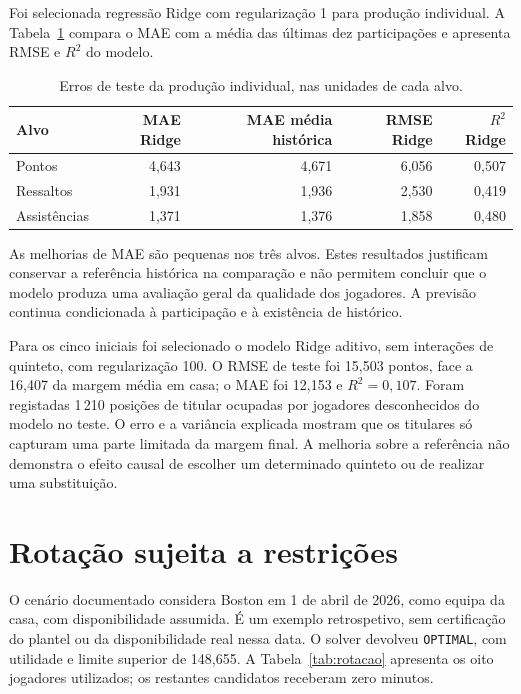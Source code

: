 Foi selecionada regressão Ridge com regularização 1 para produção
individual. A Tabela~\ref{tab:producao} compara o MAE com a média das
últimas dez participações e apresenta RMSE e \(R^2\) do modelo.

\begin{table}[htbp]
\centering
\caption{Erros de teste da produção individual, nas unidades de cada alvo.}
\label{tab:producao}
\begin{tabular}{lrrrr}
\toprule
Alvo & MAE Ridge & MAE média histórica & RMSE Ridge & \(R^2\) Ridge\\
\midrule
Pontos & 4,643 & 4,671 & 6,056 & 0,507\\
Ressaltos & 1,931 & 1,936 & 2,530 & 0,419\\
Assistências & 1,371 & 1,376 & 1,858 & 0,480\\
\bottomrule
\end{tabular}
\end{table}

As melhorias de MAE são pequenas nos três alvos. Estes resultados
justificam conservar a referência histórica na comparação e não permitem
concluir que o modelo produza uma avaliação geral da qualidade dos jogadores.
A previsão continua condicionada à participação e à existência de histórico.

Para os cinco iniciais foi selecionado o modelo Ridge aditivo, sem
interações de quinteto, com regularização 100. O RMSE de teste foi
15,503 pontos, face a 16,407 da margem média em casa; o MAE foi 12,153 e
\(R^2=0{,}107\). Foram registadas 1\,210 posições de titular ocupadas por
jogadores desconhecidos do modelo no teste. O erro e a variância explicada
mostram que os titulares só capturam uma parte limitada da margem final.
A melhoria sobre a referência não demonstra o efeito causal de escolher
um determinado quinteto ou de realizar uma substituição.

\section{Rotação sujeita a restrições}

O cenário documentado considera Boston em 1 de abril de 2026, como equipa
da casa, com disponibilidade assumida. É um exemplo retrospetivo, sem
certificação do plantel ou da disponibilidade real nessa data.
O solver devolveu \texttt{OPTIMAL}, com utilidade e limite superior de
148,655. A Tabela~\ref{tab:rotacao} apresenta os oito jogadores utilizados;
os restantes candidatos receberam zero minutos.

